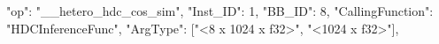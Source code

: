 "op": "__hetero_hdc_cos_sim", "Inst_ID": 1, "BB_ID": 8,
    "CallingFunction": "HDCInferenceFunc",
    "ArgType": ["<8 x 1024 x f32>", "<1024 x f32>"],
